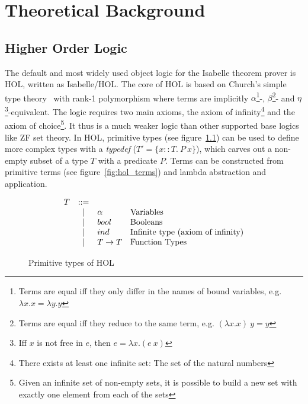 \chapter{Theoretical Background}

\section{Higher Order Logic}

The default and most widely used object logic for the Isabelle theorem prover is \ac{HOL}, written as Isabelle/HOL. The core of \ac{HOL} is based on Church's simple type theory~\cite{simple_type_theory} with rank-1 polymorphism where terms are implicitly $\alpha$\footnote{Terms are equal iff they only differ in the names of bound variables, e.g. $\lambda x.x = \lambda y.y$}-, $\beta$\footnote{Terms are equal iff they reduce to the same term, e.g. $(\lambda x.x) \: y = y$}- and $\eta$\footnote{Iff $x$ is not free in $e$, then $e = \lambda x. (e \: x)$}-equivalent. The logic requires two main axioms, the axiom of infinity\footnote{There exists at least one infinite set: The set of the natural numbers} and the axiom of choice\footnote{Given an infinite set of non-empty sets, it is possible to build a new set with exactly one element from each of the sets}. It thus is a much weaker logic than other supported base logics like \ac{ZF} set theory. In \ac{HOL}, primitive types (see figure~\ref{fig:hol_types}) can be used to define more complex types with a \textit{typedef} ($T' = \{ x :: T. \: P \: x \}$), which carves out a non-empty subset of a type $T$ with a predicate $P$. Terms can be constructed from primitive terms (see figure~\ref{fig:hol_terms}) and lambda abstraction and application.

\begin{figure} %
\[
\begin{array}{rcll}
T  & \bnfeq &  & \\ %
& \bnfor & \alpha & \text{Variables} \\
& \bnfor & bool & \text{Booleans} \\
& \bnfor & ind & \text{Infinite type (axiom of infinity)} \\
& \bnfor & T \to T & \text{Function Types} \\
\end{array}
\]
\caption{Primitive types of \ac{HOL}}
\label{fig:hol_types}
\end{figure}

